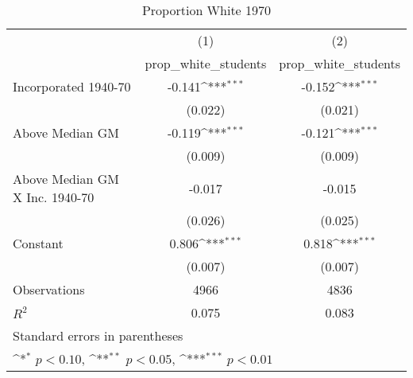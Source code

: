 \begin{table}[htbp]\centering
\def\sym#1{\ifmmode^{#1}\else\(^{#1}\)\fi}
\caption{Proportion White 1970}
\begin{tabular}{l*{2}{c}}
\hline\hline
                    &\multicolumn{1}{c}{(1)}&\multicolumn{1}{c}{(2)}\\
                    &\multicolumn{1}{c}{prop\_white\_students}&\multicolumn{1}{c}{prop\_white\_students}\\
\hline
Incorporated 1940-70&      -0.141\sym{***}&      -0.152\sym{***}\\
                    &     (0.022)         &     (0.021)         \\
[1em]
Above Median GM     &      -0.119\sym{***}&      -0.121\sym{***}\\
                    &     (0.009)         &     (0.009)         \\
[1em]
Above Median GM X Inc. 1940-70&      -0.017         &      -0.015         \\
                    &     (0.026)         &     (0.025)         \\
[1em]
Constant            &       0.806\sym{***}&       0.818\sym{***}\\
                    &     (0.007)         &     (0.007)         \\
\hline
Observations        &        4966         &        4836         \\
\(R^{2}\)           &       0.075         &       0.083         \\
\hline\hline
\multicolumn{3}{l}{\footnotesize Standard errors in parentheses}\\
\multicolumn{3}{l}{\footnotesize \sym{*} \(p<0.10\), \sym{**} \(p<0.05\), \sym{***} \(p<0.01\)}\\
\end{tabular}
\end{table}
